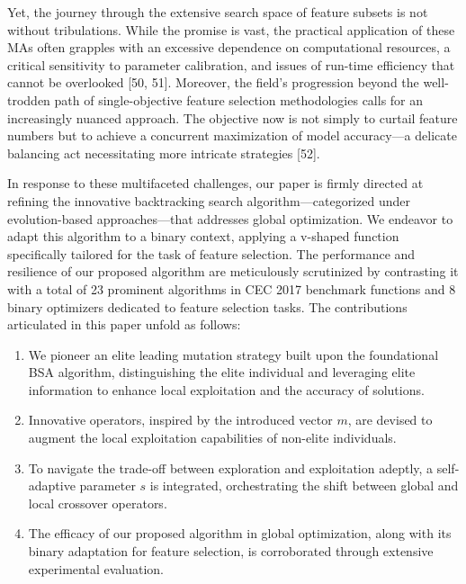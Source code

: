 \documentclass{article} %
\begin{document}
Yet, the journey through the extensive search space of feature subsets is not without tribulations. While the promise is vast, the practical application of these MAs often grapples with an excessive dependence on computational resources, a critical sensitivity to parameter calibration, and issues of run-time efficiency that cannot be overlooked [50, 51]. Moreover, the field's progression beyond the well-trodden path of single-objective feature selection methodologies calls for an increasingly nuanced approach. The objective now is not simply to curtail feature numbers but to achieve a concurrent maximization of model accuracy---a delicate balancing act necessitating more intricate strategies [52].

In response to these multifaceted challenges, our paper is firmly directed at refining the innovative backtracking search algorithm---categorized under evolution-based approaches---that addresses global optimization. We endeavor to adapt this algorithm to a binary context, applying a v-shaped function specifically tailored for the task of feature selection. The performance and resilience of our proposed algorithm are meticulously scrutinized by contrasting it with a total of 23 prominent algorithms in CEC 2017 benchmark functions and 8 binary optimizers dedicated to feature selection tasks. The contributions articulated in this paper unfold as follows:

\begin{enumerate}
\item  We pioneer an elite leading mutation strategy built upon the foundational BSA algorithm, distinguishing the elite individual and leveraging elite information to enhance local exploitation and the accuracy of solutions.

\item  Innovative operators, inspired by the introduced vector $m$, are devised to augment the local exploitation capabilities of non-elite individuals.

\item  To navigate the trade-off between exploration and exploitation adeptly, a self-adaptive parameter $s$ is integrated, orchestrating the shift between global and local crossover operators.

\item  The efficacy of our proposed algorithm in global optimization, along with its binary adaptation for feature selection, is corroborated through extensive experimental evaluation.
\end{enumerate}
\end{document}
